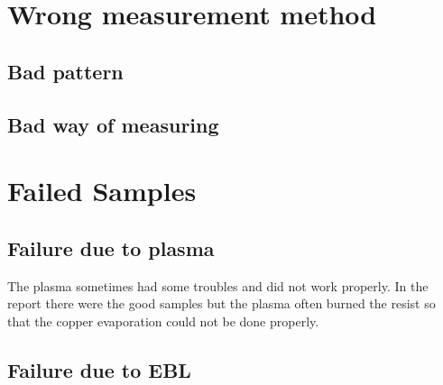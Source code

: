 \chapter{Wrong measurement method}

\section{Bad pattern}
\label{badtests}


\section{Bad way of measuring}

\label{badmeasures}

\chapter{Failed Samples}
\section{Failure due to plasma}
\label{badplasma}
The plasma sometimes had some troubles and did not work properly. In the report there were the good samples but the plasma often burned the resist so that the copper evaporation could not be done properly.

\section{Failure due to EBL}
